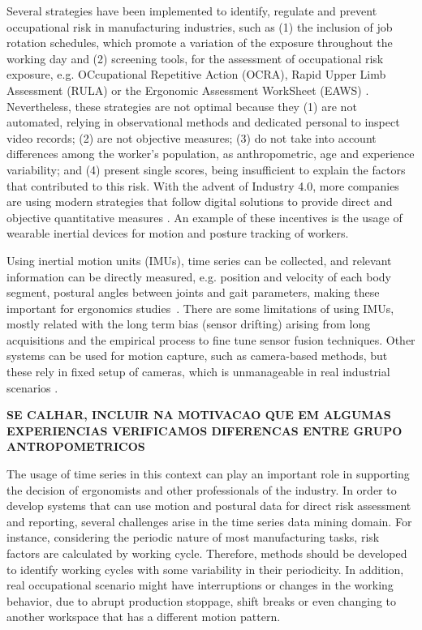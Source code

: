 Several strategies have been implemented to identify, regulate and prevent occupational risk in manufacturing industries, such as (1) the inclusion of job rotation schedules, which promote a variation of the exposure throughout the working day \cite{jobrotation} and (2) screening tools, for the assessment of occupational risk exposure, e.g. OCcupational Repetitive Action (OCRA), Rapid Upper Limb Assessment (RULA) or the Ergonomic Assessment WorkSheet (EAWS) \cite{ocra, rula, eaws}. Nevertheless, these strategies are not optimal because they (1) are not automated, relying in observational methods and dedicated personal to inspect video records; (2) are not objective measures; (3) do not take into account differences among the worker's population, as anthropometric, age and experience variability; and (4) present single scores, being insufficient to explain the factors that contributed to this risk. With the advent of Industry 4.0, more companies are using modern strategies that follow digital solutions to provide direct and objective quantitative measures \cite{romero}. An example of these incentives is the usage of wearable inertial devices for motion and posture tracking of workers.

Using inertial motion units (IMUs), time series can be collected, and relevant information can be directly measured, e.g. position and velocity of each body segment, postural angles between joints and gait parameters, making these important for ergonomics studies~\cite{Caputo2019, Hang19}. There are some limitations of using IMUs, mostly related with the long term bias (sensor drifting) arising from long acquisitions and the empirical process to fine tune sensor fusion techniques. Other systems can be used for motion capture, such as camera-based methods, but these rely in fixed setup of cameras, which is unmanageable in real industrial scenarios \cite{sara}.

\textbf{SE CALHAR, INCLUIR NA MOTIVACAO QUE EM ALGUMAS EXPERIENCIAS VERIFICAMOS DIFERENCAS ENTRE GRUPO ANTROPOMETRICOS}

The usage of time series in this context can play an important role in supporting the decision of ergonomists and other professionals of the industry. In order to develop systems that can use motion and postural data for direct risk assessment and reporting, several challenges arise in the time series data mining domain. For instance, considering the periodic nature of most manufacturing tasks, risk factors are calculated by working cycle. Therefore, methods should be developed to identify working cycles with some variability in their periodicity. In addition, real occupational scenario might have interruptions or changes in the working behavior, due to abrupt production stoppage, shift breaks or even changing to another workspace that has a different motion pattern. 

